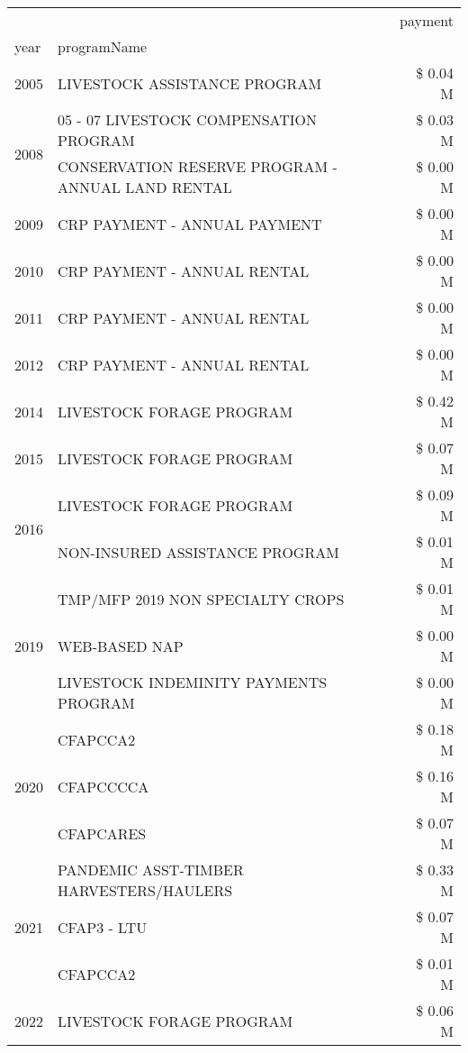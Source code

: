 \begin{tabular}{llr}
\toprule
 &  & payment \\
year & programName &  \\
\midrule
2005 & LIVESTOCK ASSISTANCE PROGRAM & \$ 0.04 M \\
\cline{1-3}
\multirow[t]{2}{*}{2008} & 05 - 07 LIVESTOCK COMPENSATION PROGRAM & \$ 0.03 M \\
 & CONSERVATION RESERVE PROGRAM - ANNUAL LAND RENTAL & \$ 0.00 M \\
\cline{1-3}
2009 & CRP PAYMENT - ANNUAL PAYMENT & \$ 0.00 M \\
\cline{1-3}
2010 & CRP PAYMENT - ANNUAL RENTAL & \$ 0.00 M \\
\cline{1-3}
2011 & CRP PAYMENT - ANNUAL RENTAL & \$ 0.00 M \\
\cline{1-3}
2012 & CRP PAYMENT - ANNUAL RENTAL & \$ 0.00 M \\
\cline{1-3}
2014 & LIVESTOCK FORAGE PROGRAM & \$ 0.42 M \\
\cline{1-3}
2015 & LIVESTOCK FORAGE PROGRAM & \$ 0.07 M \\
\cline{1-3}
\multirow[t]{2}{*}{2016} & LIVESTOCK FORAGE PROGRAM & \$ 0.09 M \\
 & NON-INSURED ASSISTANCE PROGRAM & \$ 0.01 M \\
\cline{1-3}
\multirow[t]{3}{*}{2019} & TMP/MFP 2019 NON SPECIALTY CROPS & \$ 0.01 M \\
 & WEB-BASED NAP & \$ 0.00 M \\
 & LIVESTOCK INDEMINITY PAYMENTS PROGRAM & \$ 0.00 M \\
\cline{1-3}
\multirow[t]{3}{*}{2020} & CFAPCCA2 & \$ 0.18 M \\
 & CFAPCCCCA & \$ 0.16 M \\
 & CFAPCARES & \$ 0.07 M \\
\cline{1-3}
\multirow[t]{3}{*}{2021} & PANDEMIC ASST-TIMBER HARVESTERS/HAULERS & \$ 0.33 M \\
 & CFAP3 - LTU & \$ 0.07 M \\
 & CFAPCCA2 & \$ 0.01 M \\
\cline{1-3}
2022 & LIVESTOCK FORAGE PROGRAM & \$ 0.06 M \\
\cline{1-3}
\bottomrule
\end{tabular}

